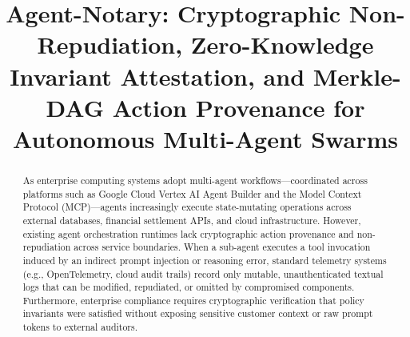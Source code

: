 \documentclass[conference,10pt]{IEEEtran}
\begin{document}
\title{Agent-Notary: Cryptographic Non-Repudiation, Zero-Knowledge Invariant Attestation, and Merkle-DAG Action Provenance for Autonomous Multi-Agent Swarms}

\author{
}

\maketitle

\begin{abstract}
As enterprise computing systems adopt multi-agent workflows---coordinated across platforms such as Google Cloud Vertex AI Agent Builder and the Model Context Protocol (MCP)---agents increasingly execute state-mutating operations across external databases, financial settlement APIs, and cloud infrastructure. However, existing agent orchestration runtimes lack cryptographic action provenance and non-repudiation across service boundaries. When a sub-agent executes a tool invocation induced by an indirect prompt injection or reasoning error, standard telemetry systems (e.g., OpenTelemetry, cloud audit trails) record only mutable, unauthenticated textual logs that can be modified, repudiated, or omitted by compromised components. Furthermore, enterprise compliance requires cryptographic verification that policy invariants were satisfied without exposing sensitive customer context or raw prompt tokens to external auditors.


\end{abstract}
\end{document}

